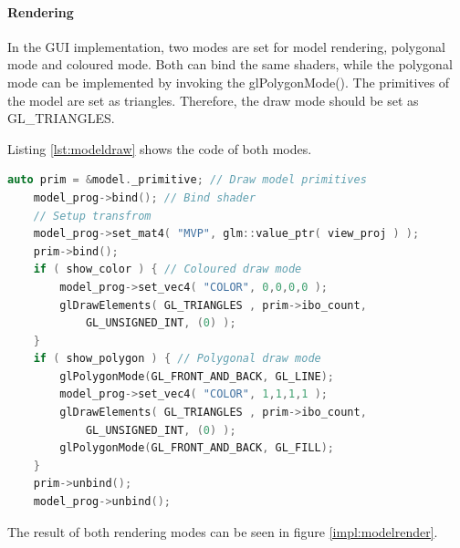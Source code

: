 \paragraph{Rendering}

In the GUI implementation, two modes are set for model rendering, polygonal mode and coloured mode. Both can bind the same shaders, while the polygonal mode can be implemented by invoking the glPolygonMode(). The primitives of the model are set as triangles. Therefore, the draw mode should be set as GL\_TRIANGLES.

\hspace*{\fill}

Listing \ref{lst:modeldraw} shows the code of both modes.

\begin{lstlisting}[language=C++, label={lst:modeldraw}, caption = Function of creating triangular primitives]
    auto prim = &model._primitive; // Draw model primitives
    model_prog->bind(); // Bind shader
    // Setup transfrom
    model_prog->set_mat4( "MVP", glm::value_ptr( view_proj ) );
    prim->bind();
    if ( show_color ) { // Coloured draw mode
        model_prog->set_vec4( "COLOR", 0,0,0,0 );
        glDrawElements( GL_TRIANGLES , prim->ibo_count,
            GL_UNSIGNED_INT, (0) );
    }
    if ( show_polygon ) { // Polygonal draw mode
        glPolygonMode(GL_FRONT_AND_BACK, GL_LINE);
        model_prog->set_vec4( "COLOR", 1,1,1,1 );
        glDrawElements( GL_TRIANGLES , prim->ibo_count, 
            GL_UNSIGNED_INT, (0) );
        glPolygonMode(GL_FRONT_AND_BACK, GL_FILL);
    }
    prim->unbind();
    model_prog->unbind();
\end{lstlisting}

\clearpage

The result of both rendering modes can be seen in figure \ref{impl:modelrender}.


